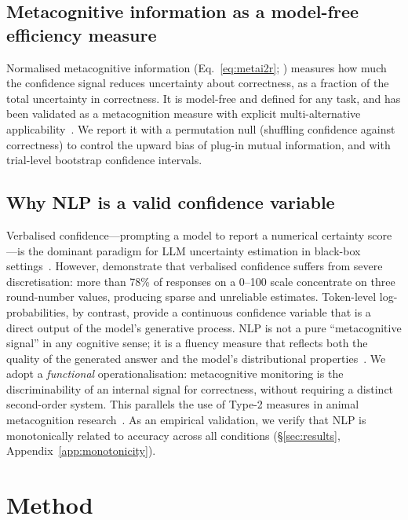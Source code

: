 \documentclass{article}
\begin{document}
\subsection{Metacognitive information as a model-free efficiency measure}
\label{sec:whyinfo}

Normalised metacognitive information (Eq.~\ref{eq:metai2r}; \citealt{dayan2023metacognitive}) measures how much the confidence signal reduces uncertainty about correctness, as a fraction of the total uncertainty in correctness. It is model-free and defined for any task, and has been validated as a metacognition measure with explicit multi-alternative applicability~\citep{fitousi2025information}. We report it with a permutation null (shuffling confidence against correctness) to control the upward bias of plug-in mutual information, and with trial-level bootstrap confidence intervals.

\subsection{Why NLP is a valid confidence variable}

Verbalised confidence---prompting a model to report a numerical certainty score---is the dominant paradigm for LLM uncertainty estimation in black-box settings~\citep{xiong2024can}. However, \citet{dai2026rescaling} demonstrate that verbalised confidence suffers from severe discretisation: more than 78\% of responses on a 0--100 scale concentrate on three round-number values, producing sparse and unreliable estimates. Token-level log-probabilities, by contrast, provide a continuous confidence variable that is a direct output of the model's generative process. NLP is not a pure ``metacognitive signal'' in any cognitive sense; it is a fluency measure that reflects both the quality of the generated answer and the model's distributional properties~\citep{cacioli2026llms}. We adopt a \emph{functional} operationalisation: metacognitive monitoring is the discriminability of an internal signal for correctness, without requiring a distinct second-order system. This parallels the use of Type-2 measures in animal metacognition research~\citep{smith2014metacognitive}. As an empirical validation, we verify that NLP is monotonically related to accuracy across all conditions (\S\ref{sec:results}, Appendix~\ref{app:monotonicity}).

\section{Method}
\end{document}
